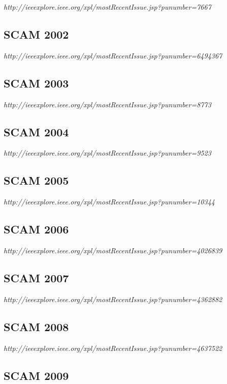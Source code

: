 {\small \em http://ieeexplore.ieee.org/xpl/mostRecentIssue.jsp?punumber=7667}


\subsection{SCAM 2002}

{\small \em http://ieeexplore.ieee.org/xpl/mostRecentIssue.jsp?punumber=6494367}


\subsection{SCAM 2003}

{\small \em http://ieeexplore.ieee.org/xpl/mostRecentIssue.jsp?punumber=8773}

\subsection{SCAM 2004}

{\small \em http://ieeexplore.ieee.org/xpl/mostRecentIssue.jsp?punumber=9523}

\subsection{SCAM 2005}

{\small \em http://ieeexplore.ieee.org/xpl/mostRecentIssue.jsp?punumber=10344}

\subsection{SCAM 2006}

{\small \em http://ieeexplore.ieee.org/xpl/mostRecentIssue.jsp?punumber=4026839}


\subsection{SCAM 2007}

{\small \em http://ieeexplore.ieee.org/xpl/mostRecentIssue.jsp?punumber=4362882}

\subsection{SCAM 2008}

{\small \em http://ieeexplore.ieee.org/xpl/mostRecentIssue.jsp?punumber=4637522}

\subsection{SCAM 2009}

